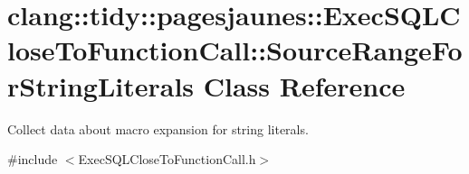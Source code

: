 \hypertarget{classclang_1_1tidy_1_1pagesjaunes_1_1_exec_s_q_l_close_to_function_call_1_1_source_range_for_string_literals}{}\section{clang\+:\+:tidy\+:\+:pagesjaunes\+:\+:Exec\+S\+Q\+L\+Close\+To\+Function\+Call\+:\+:Source\+Range\+For\+String\+Literals Class Reference}
\label{classclang_1_1tidy_1_1pagesjaunes_1_1_exec_s_q_l_close_to_function_call_1_1_source_range_for_string_literals}


Collect data about macro expansion for string literals.  




{\ttfamily \#include $<$Exec\+S\+Q\+L\+Close\+To\+Function\+Call.\+h$>$}

